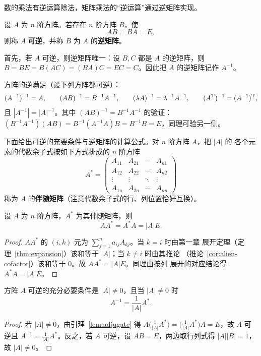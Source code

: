 数的乘法有逆运算除法，矩阵乘法的“逆运算”通过逆矩阵实现。

\begin{definition}\label{def:inverse}
设 $A$ 为 $n$ 阶方阵。若存在 $n$ 阶方阵 $B$，使
\[
  AB=BA=E,
\]
则称 $A$ \textbf{可逆}，并称 $B$ 为 $A$ 的\textbf{逆矩阵}。
\end{definition}

首先，若 $A$ 可逆，则逆矩阵唯一：设 $B,C$ 都是 $A$ 的逆矩阵，则
$B=BE=B(AC)=(BA)C=EC=C$。因此把 $A$ 的逆矩阵记作 $A^{-1}$。

方阵的逆满足（设下列方阵都可逆）：
\[
  (A^{-1})^{-1}=A,\qquad (AB)^{-1}=B^{-1}A^{-1},\qquad
  (\lambda A)^{-1}=\lambda^{-1}A^{-1},\qquad
  (A^{\mathrm{T}})^{-1}=(A^{-1})^{\mathrm{T}},
\]
且 $|A^{-1}|=|A|^{-1}$。其中 $(AB)^{-1}=B^{-1}A^{-1}$ 的验证：
$(B^{-1}A^{-1})(AB)=B^{-1}(A^{-1}A)B=B^{-1}B=E$，同理可验另一侧。

下面给出可逆的充要条件与逆矩阵的计算公式。对 $n$ 阶方阵 $A$，把 $|A|$ 的
各个元素的代数余子式按如下方式排成的 $n$ 阶方阵
\[
  A^*=\begin{pmatrix}
    A_{11} & A_{21} & \cdots & A_{n1} \\
    A_{12} & A_{22} & \cdots & A_{n2} \\
    \vdots & \vdots & \ddots & \vdots \\
    A_{1n} & A_{2n} & \cdots & A_{nn}
  \end{pmatrix}
\]
称为 $A$ 的\textbf{伴随矩阵}（注意代数余子式的行、列位置恰好互换）。

\begin{lemma}\label{lem:adjugate}
设 $A$ 为 $n$ 阶方阵，$A^*$ 为其伴随矩阵，则
\[
  AA^*=A^*A=|A|E .
\]
\end{lemma}
\begin{proof}
$AA^*$ 的 $(i,k)$ 元为 $\sum_{j=1}^{n}a_{ij}A_{kj}$。当 $k=i$ 时由第一章
展开定理（定理~\ref{thm:expansion}）该和等于 $|A|$；当 $k\neq i$ 时由其推论
（推论~\ref{cor:alien-cofactor}）该和等于 $0$。故 $AA^*=|A|E$。同理由按列
展开的对应结论得 $A^*A=|A|E$。
\end{proof}

\begin{theorem}\label{thm:inverse-det}
方阵 $A$ 可逆的充分必要条件是 $|A|\neq 0$，且当 $|A|\neq 0$ 时
\[
  A^{-1}=\frac{1}{|A|}A^* .
\]
\end{theorem}
\begin{proof}
若 $|A|\neq 0$，由引理~\ref{lem:adjugate} 得
$A\big(\tfrac{1}{|A|}A^*\big)=\big(\tfrac{1}{|A|}A^*\big)A=E$，故 $A$ 可逆且
$A^{-1}=\tfrac{1}{|A|}A^*$。反之，若 $A$ 可逆，设 $AB=E$，两边取行列式得
$|A||B|=1$，故 $|A|\neq 0$。
\end{proof}

